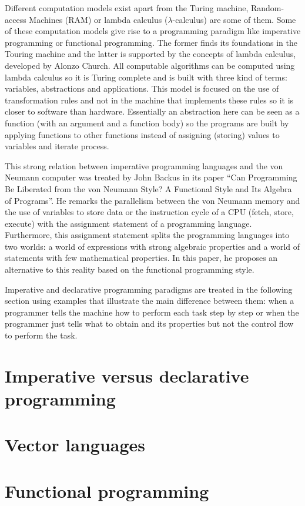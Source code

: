 Different computation models exist apart from the Turing machine, Random-access Machines (RAM) or lambda calculus ($\lambda$-calculus) are 
some of them. Some of these computation models give rise to a programming paradigm like imperative programming or functional programming. The 
former finds its foundations in the Touring machine and the latter is supported by the concepts of lambda calculus, developed by Alonzo 
Church. All computable algorithms can be computed using lambda calculus so it is Turing complete and is built with three kind of terms: 
variables, abstractions and applications. This model is focused on the use of transformation rules and not in the machine that implements 
these rules so it is closer to software than hardware. Essentially an abstraction here can be seen as a function (with an argument and a 
function body) so the programs are built by applying functions to other functions instead of assigning (storing) values to variables and 
iterate  process. 


This strong relation between imperative programming languages and the von Neumann computer was treated by John Backus in its paper ``Can 
Programming Be Liberated from the von Neumann Style? A Functional Style and Its Algebra of Programs''. He remarks the parallelism between the 
von Neumann memory and the use of variables to store data or the instruction cycle of a CPU (fetch, store, execute) with the assignment 
statement of a programming language. Furthermore, this assignment statement splits the programming languages into two worlds: a world of 
expressions with strong algebraic properties and a world of statements with few mathematical properties. In this paper, he proposes an 
alternative to this reality based on the functional programming style. 

Imperative and declarative programming paradigms are treated in the following section using examples that illustrate the main difference 
between them: when a programmer tells the machine how to perform each task step by step or when the programmer just tells what to obtain and 
its properties but not the control flow to perform the task. 



 
 
 \section{Imperative versus declarative programming} 
 
 \section{Vector languages}
 
 \section{Functional programming}